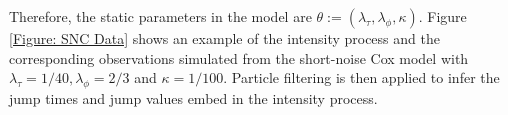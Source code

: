 \documentclass[12pt,a4paper]{article}
\begin{document}
Therefore, the static parameters in the model are \(\theta:=(\lambda_\tau,\lambda_\phi,\kappa)\). Figure \ref{Figure: SNC Data} shows an example of the intensity process and the corresponding observations simulated from the short-noise Cox model with \(\lambda_\tau = 1/40, \lambda_\phi=2/3\) and \(\kappa=1/100\). Particle filtering is then applied to infer the jump times and jump values embed in the intensity process. 

\end{document}
